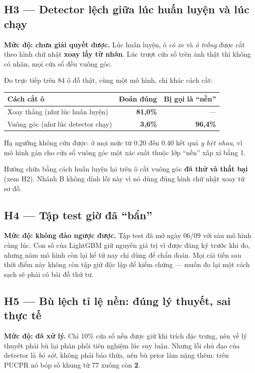\documentclass[12pt]{ai_conquer2026}
\begin{document}
\subsection{H3 --- Detector lệch giữa lúc huấn luyện và lúc chạy}

\textbf{Mức độ: chưa giải quyết được.} Lúc huấn luyện, ô \textit{có xe} và \textit{ô trống} được cắt theo hình chữ nhật \textbf{xoay lấy từ nhãn}. Lúc trượt cửa sổ trên ảnh thật thì không có nhãn, mọi cửa sổ đều vuông góc.

Đo trực tiếp trên 84 ô đỗ thật, cùng một mô hình, chỉ khác cách cắt:

\begin{center}
\begin{tabular}{|l|r|r|}
\hline
\textbf{Cách cắt ô} & \textbf{Đoán đúng} & \textbf{Bị gọi là ``nền''} \\
\hline
Xoay thẳng (như lúc huấn luyện) & \textbf{81,0\%} & --- \\
Vuông góc (như lúc detector chạy) & \textbf{3,6\%} & \textbf{96,4\%} \\
\hline
\end{tabular}
\end{center}

Hạ ngưỡng không cứu được: ở mọi mức từ 0.20 đến 0.40 kết quả \textit{y hệt nhau}, vì mô hình gán cho cửa sổ vuông góc một xác suất thuộc lớp ``nền'' xấp xỉ bằng 1.

Hướng chữa bằng cách huấn luyện lại trên ô cắt vuông góc \textbf{đã thử và thất bại} (xem H2). Nhánh B không dính lỗi này vì nó dùng đúng hình chữ nhật xoay từ sơ đồ.

\subsection{H4 --- Tập test giờ đã ``bẩn''}

\textbf{Mức độ: không đảo ngược được.} Tập test đã mở ngày 06/09 với sáu mô hình cùng lúc. Con số của LightGBM giữ nguyên giá trị vì được đăng ký trước khi đo, nhưng năm mô hình còn lại kể từ nay chỉ dùng để chẩn đoán. Mọi cải tiến sau thời điểm này không còn tập giữ độc lập để kiểm chứng --- muốn đo lại một cách sạch sẽ phải có bãi đỗ thứ tư.

\subsection{H5 --- Bù lệch tỉ lệ nền: đúng lý thuyết, sai thực tế}

\textbf{Mức độ: đã xử lý.} Chỉ 10\% cửa sổ nền được giữ khi trích đặc trưng, nên về lý thuyết phải bù lại phân phối tiên nghiệm lúc suy luận. Nhưng lỗi chủ đạo của detector là \textit{bỏ sót}, không phải báo thừa, nên bù prior làm nặng thêm: trên PUCPR nó bóp số khung từ 77 xuống còn \textbf{2}.
\end{document}
